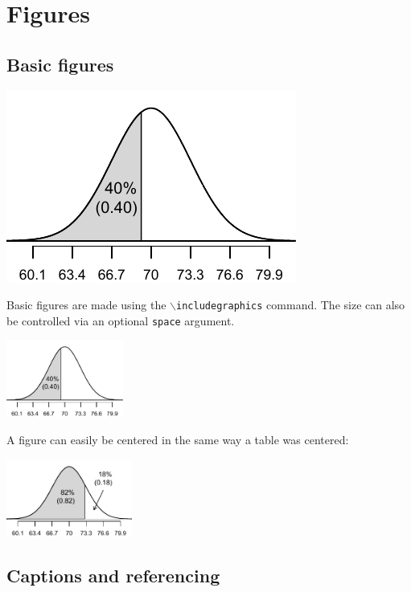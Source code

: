 \documentclass[11pt]{article} %
\begin{document}
\section{Figures}

\subsection{Basic figures}

\includegraphics{normalPlots/lower40}

Basic figures are made using the \texttt{$\backslash$includegraphics} command. The size can also be controlled via an optional \texttt{space} argument.

\includegraphics[height=1.0in]{normalPlots/lower40}

A figure can easily be centered in the same way a table was centered:
\begin{center}
\includegraphics[height=1.0in]{normalPlots/lower82/lower82}
\end{center}

\subsection{Captions and referencing}
\end{document}
